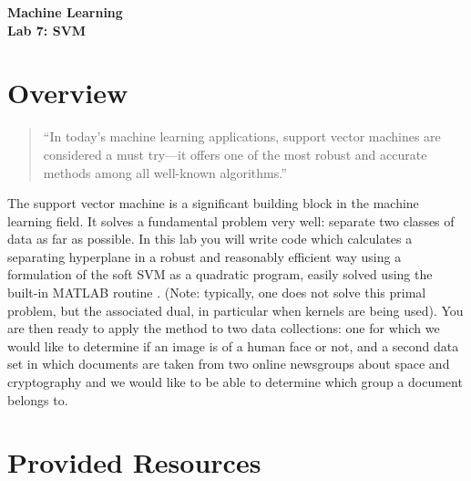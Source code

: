 \documentclass[11pt,noanswers,addpoints]{exam}
\begin{document}
{\Large{\textbf{Machine Learning}}} \\[2mm]
\textbf{\Huge{Lab 7: SVM}}\\[2mm]

\section{Overview}

\begin{quote}
``In today's machine learning applications, support vector machines are considered a must try---it offers one of the most robust and accurate methods among all well-known algorithms.''

\end{quote}

The support vector machine is a significant building block in the machine learning 
field. It solves a fundamental problem very well: separate two classes of data as far as possible.
In this lab you will write code which calculates a separating hyperplane in a robust and reasonably
efficient way using a formulation of the soft SVM as a quadratic program, easily solved using the
built-in MATLAB routine . (Note: typically, one does not solve this primal problem, but the associated dual, in particular when kernels are being used). You are then ready to apply the method to two
data collections: one for
which we would like to determine if an image is of a human face or not, and a second data set in
which documents are taken from two online newsgroups about space and cryptography and we would like to 
be able to determine which group a document belongs to.

\section{Provided Resources}
\end{document}

